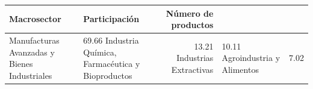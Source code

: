 \begin{tabular}{llr}
\toprule
Macrosector & Participación & Número de productos \\
\midrule
Manufacturas Avanzadas y Bienes Industriales & 69.66%
Industria Química, Farmacéutica y Bioproductos & 13.21%
Industrias Extractivas & 10.11%
Agroindustria y Alimentos & 7.02%
\bottomrule
\end{tabular}
